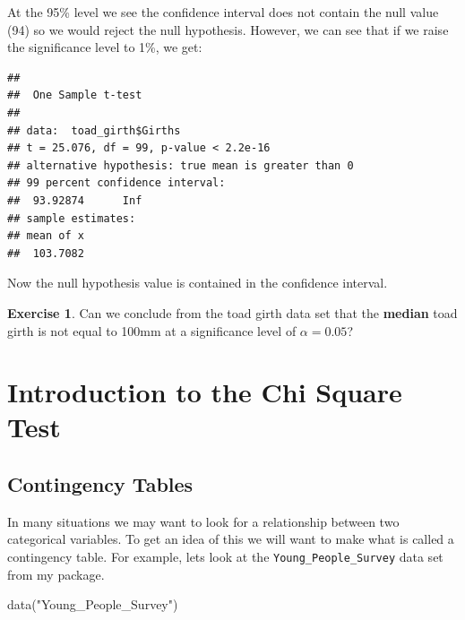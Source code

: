 \documentclass[
]{book}
\newenvironment{Shaded}{\begin{snugshade}}{\end{snugshade}}
\newcommand{\AttributeTok}[1]{\textcolor[rgb]{0.77,0.63,0.00}{#1}}
\newcommand{\FloatTok}[1]{\textcolor[rgb]{0.00,0.00,0.81}{#1}}
\newcommand{\FunctionTok}[1]{\textcolor[rgb]{0.00,0.00,0.00}{#1}}
\newcommand{\NormalTok}[1]{#1}
\newcommand{\SpecialCharTok}[1]{\textcolor[rgb]{0.00,0.00,0.00}{#1}}
\newcommand{\StringTok}[1]{\textcolor[rgb]{0.31,0.60,0.02}{#1}}
\theoremstyle{definition}
\theoremstyle{definition}
\theoremstyle{definition}
\newtheorem{exercise}{Exercise}[chapter]
\theoremstyle{definition}
\theoremstyle{remark}
\begin{document}
At the 95\% level we see the confidence interval does not contain the null value (94) so we would reject the null hypothesis. However, we can see that if we raise the significance level to 1\%, we get:

\begin{Shaded}
\end{Shaded}

\begin{verbatim}
## 
##  One Sample t-test
## 
## data:  toad_girth$Girths
## t = 25.076, df = 99, p-value < 2.2e-16
## alternative hypothesis: true mean is greater than 0
## 99 percent confidence interval:
##  93.92874      Inf
## sample estimates:
## mean of x 
##  103.7082
\end{verbatim}

Now the null hypothesis value is contained in the confidence interval.

\begin{exercise}
\protect\hypertarget{exr:unnamed-chunk-584}{}\label{exr:unnamed-chunk-584}Can we conclude from the toad girth data set that the \textbf{median} toad girth is not equal to 100mm at a significance level of \(\alpha=0.05\)?
\end{exercise}

\hypertarget{introduction-to-the-chi-square-test}{%
\chapter{Introduction to the Chi Square Test}\label{introduction-to-the-chi-square-test}}

\hypertarget{contingency-tables}{%
\section{Contingency Tables}\label{contingency-tables}}

In many situations we may want to look for a relationship between two categorical variables. To get an idea of this we will want to make what is called a contingency table. For example, lets look at the \texttt{Young\_People\_Survey} data set from my package.

\begin{Shaded}
\begin{Highlighting}[]
\FunctionTok{data}\NormalTok{(}\StringTok{"Young\_People\_Survey"}\NormalTok{)}
\end{Highlighting}
\end{Shaded}
\end{document}
